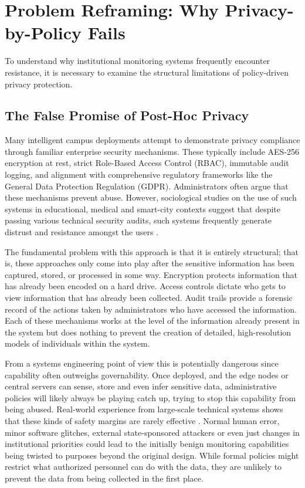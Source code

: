 \documentclass[conference]{IEEEtran}
\begin{document}
\section{Problem Reframing: Why Privacy-by-Policy Fails}

To understand why institutional monitoring systems frequently encounter resistance, it is necessary to examine the structural limitations of policy-driven privacy protection.

\subsection{The False Promise of Post-Hoc Privacy}
Many intelligent campus deployments attempt to demonstrate privacy compliance through familiar enterprise security mechanisms. These typically include AES-256 encryption at rest, strict Role-Based Access Control (RBAC), immutable audit logging, and alignment with comprehensive regulatory frameworks like the General Data Protection Regulation (GDPR). Administrators often argue that these mechanisms prevent abuse. However, sociological studies on the use of such systems in educational, medical and smart-city contexts suggest that despite passing various technical security audits, such systems frequently generate distrust and resistance amongst the users \cite{b5}.

The fundamental problem with this approach is that it is entirely structural; that is, these approaches only come into play after the sensitive information has been captured, stored, or processed in some way. Encryption protects information that has already been encoded on a hard drive. Access controls dictate who gets to view information that has already been collected. Audit trails provide a forensic record of the actions taken by administrators who have accessed the information. Each of these mechanisms works at the level of the information already present in the system but does nothing to prevent the creation of detailed, high-resolution models of individuals within the system.

From a systems engineering point of view this is potentially dangerous since capability often outweighs governability. Once deployed, and the edge nodes or central servers can sense, store and even infer sensitive data, administrative policies will likely always be playing catch up, trying to stop this capability from being abused. Real-world experience from large-scale technical systems shows that these kinds of safety margins are rarely effective \cite{b4}. Normal human error, minor software glitches, external state-sponsored attackers or even just changes in institutional priorities could lead to the initially benign monitoring capabilities being twisted to purposes beyond the original design. While formal policies might restrict what authorized personnel can do with the data, they are unlikely to prevent the data from being collected in the first place.
\end{document}
